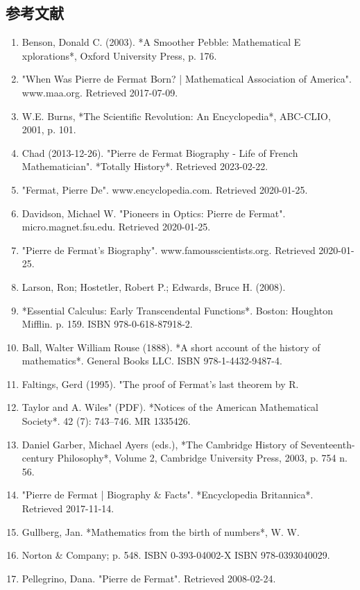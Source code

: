 \subsection{参考文献}  
\begin{enumerate}
\item Benson, Donald C. (2003). *A Smoother Pebble: Mathematical E
xplorations*, Oxford University Press, p. 176.  
\item "When Was Pierre de Fermat Born? | Mathematical Association of America". www.maa.org. Retrieved 2017-07-09.  
\item W.E. Burns, *The Scientific Revolution: An Encyclopedia*, ABC-CLIO, 2001, p. 101.  
\item Chad (2013-12-26). "Pierre de Fermat Biography - Life of French Mathematician". *Totally History*. Retrieved 2023-02-22.  
\item "Fermat, Pierre De". www.encyclopedia.com. Retrieved 2020-01-25.  
\item Davidson, Michael W. "Pioneers in Optics: Pierre de Fermat". micro.magnet.fsu.edu. Retrieved 2020-01-25.  
\item "Pierre de Fermat's Biography". www.famousscientists.org. Retrieved 2020-01-25.  
\item Larson, Ron; Hostetler, Robert P.; Edwards, Bruce H. (2008). \item *Essential Calculus: Early Transcendental Functions*. Boston: Houghton Mifflin. p. 159. ISBN 978-0-618-87918-2.  
\item Ball, Walter William Rouse (1888). *A short account of the history of mathematics*. General Books LLC. ISBN 978-1-4432-9487-4.  
\item Faltings, Gerd (1995). "The proof of Fermat's last theorem by R. \item Taylor and A. Wiles" (PDF). *Notices of the American Mathematical Society*. 42 (7): 743–746. MR 1335426.  
\item Daniel Garber, Michael Ayers (eds.), *The Cambridge History of Seventeenth-century Philosophy*, Volume 2, Cambridge University Press, 2003, p. 754 n. 56.  
\item "Pierre de Fermat | Biography & Facts". *Encyclopedia Britannica*. Retrieved 2017-11-14.  
\item Gullberg, Jan. *Mathematics from the birth of numbers*, W. W. \item Norton & Company; p. 548. ISBN 0-393-04002-X ISBN 978-0393040029.  
\item Pellegrino, Dana. "Pierre de Fermat". Retrieved 2008-02-24.  

\end{enumerate}
